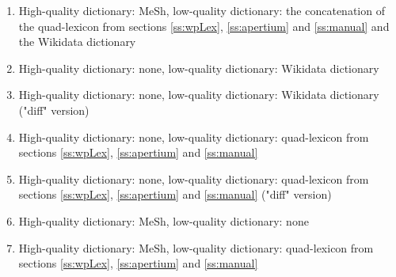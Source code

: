 \documentclass[a4paper,11pt]{article}
\begin{document}
	\begin{enumerate}
		\item High-quality dictionary: MeSh, low-quality dictionary: the concatenation of the quad-lexicon from sections \ref{ss:wpLex}, \ref{ss:apertium}
		and \ref{ss:manual} and the Wikidata dictionary
		\item High-quality dictionary: none, low-quality dictionary: Wikidata dictionary
		\item High-quality dictionary: none, low-quality dictionary: Wikidata dictionary ("diff" version)
		\item High-quality dictionary: none, low-quality dictionary: quad-lexicon from sections \ref{ss:wpLex}, \ref{ss:apertium}
		and \ref{ss:manual}
		\item High-quality dictionary: none, low-quality dictionary: quad-lexicon from sections \ref{ss:wpLex}, \ref{ss:apertium}
		and \ref{ss:manual} ("diff" version)
		\item High-quality dictionary: MeSh, low-quality dictionary: none
		\item High-quality dictionary: MeSh, low-quality dictionary: quad-lexicon from sections \ref{ss:wpLex}, \ref{ss:apertium}
		and \ref{ss:manual}
	\end{enumerate}
\end{document}
